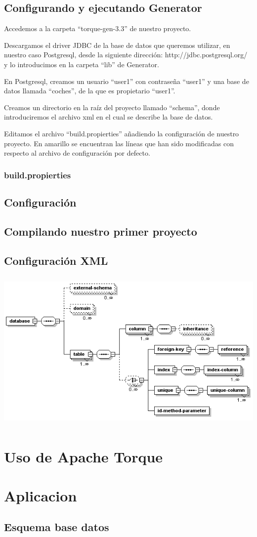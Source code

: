 \documentclass[12pt, oneside]{article}
\begin{document}
\subsection{Configurando y ejecutando Generator}
Accedemos a la carpeta “torque-gen-3.3” de nuestro proyecto.

Descargamos el driver JDBC de la base de datos que queremos utilizar, en nuestro caso Postgresql, desde la siguiente dirección: http://jdbc.postgresql.org/ y lo introducimos en la carpeta “lib” de Generator.

En Postgresql, creamos un usuario “user1” con contraseña “user1” y una base de datos llamada “coches”, de la que es propietario “user1”.

Creamos un directorio en la raíz del proyecto llamado “schema”, donde introduciremos el archivo xml en el cual se describe la base de datos.

Editamos el archivo “build.propierties” añadiendo la configuración de nuestro proyecto. En amarillo se encuentran las líneas que han sido modificadas con respecto al archivo de configuración por defecto.

\subsubsection{build.propierties}


\subsection{Configuración}
\subsection{Compilando nuestro primer proyecto}
\subsection{Configuración XML}
	\begin{center}
		\includegraphics[height=8cm]{img/xml-config.png}
	\end{center}

\section{Uso de Apache Torque}

\section{Aplicacion}
\subsection{Esquema base datos}

\end{document}
